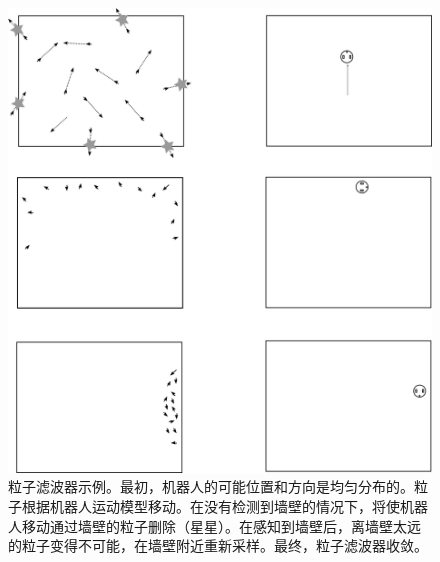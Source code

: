 \begin{figure}
	\centering
		\includegraphics[width=\textwidth]{figs/particlefilter_example}
	\caption{粒子滤波器示例。最初，机器人的可能位置和方向是均匀分布的。粒子根据机器人运动模型移动。在没有检测到墙壁的情况下，将使机器人移动通过墙壁的粒子删除（星星）。在感知到墙壁后，离墙壁太远的粒子变得不可能，在墙壁附近重新采样。最终，粒子滤波器收敛。}
	\label{fig:particlefilter_example}
\end{figure}

